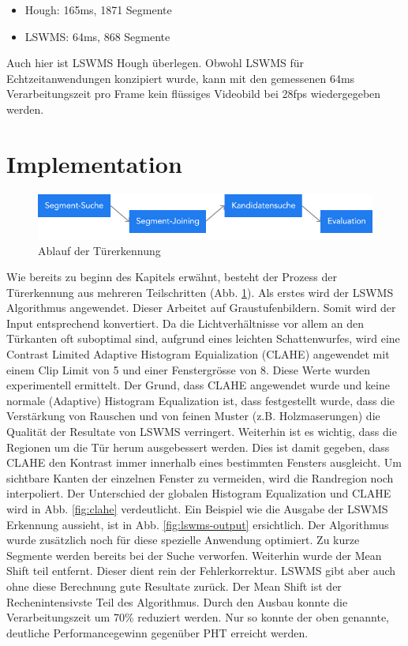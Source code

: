 \begin{itemize}
	\item Hough: 165ms, 1871 Segmente
	\item LSWMS: 64ms, 868 Segmente
\end{itemize}
\noindent
Auch hier ist LSWMS Hough überlegen. Obwohl LSWMS für Echtzeitanwendungen konzipiert wurde, kann mit den gemessenen 64ms Verarbeitungszeit pro Frame kein flüssiges Videobild bei 28fps wiedergegeben werden.

\section{Implementation}

\begin{figure}[!ht]
\centering
\includegraphics[width=\textwidth]{images/door-detection} 
\caption{Ablauf der Türerkennung}
\label{fig:door-detection}
\end{figure}
\noindent
Wie bereits zu beginn des Kapitels erwähnt, besteht der Prozess der Türerkennung aus mehreren Teilschritten (Abb. \ref{fig:door-detection}). Als erstes wird der LSWMS Algorithmus angewendet. Dieser Arbeitet auf Graustufenbildern. Somit wird der Input entsprechend konvertiert. Da die Lichtverhältnisse vor allem an den Türkanten oft suboptimal sind, aufgrund eines leichten Schattenwurfes, wird eine Contrast Limited Adaptive Histogram Equialization (CLAHE) angewendet mit einem Clip Limit von 5 und einer Fenstergrösse von 8. Diese Werte wurden experimentell ermittelt. Der Grund, dass CLAHE angewendet wurde und keine normale (Adaptive) Histogram Equalization ist, dass festgestellt wurde, dass die Verstärkung von Rauschen und von feinen Muster (z.B. Holzmaserungen) die Qualität der Resultate von LSWMS verringert. Weiterhin ist es wichtig, dass die Regionen um die Tür herum ausgebessert werden. Dies ist damit gegeben, dass CLAHE den Kontrast immer innerhalb eines bestimmten Fensters ausgleicht. Um sichtbare Kanten der einzelnen Fenster zu vermeiden, wird die Randregion noch interpoliert. Der Unterschied der globalen Histogram Equalization und CLAHE wird in Abb. \ref{fig:clahe} verdeutlicht. Ein Beispiel wie die Ausgabe der LSWMS Erkennung aussieht, ist in Abb. \ref{fig:lswms-output} ersichtlich. Der Algorithmus wurde zusätzlich noch für diese spezielle Anwendung optimiert. Zu kurze Segmente werden bereits bei der Suche verworfen. Weiterhin wurde der Mean Shift teil entfernt. Dieser dient rein der Fehlerkorrektur. LSWMS gibt aber auch ohne diese Berechnung gute Resultate zurück. Der Mean Shift ist der Rechenintensivste Teil des Algorithmus. Durch den Ausbau konnte die Verarbeitungszeit um 70\% reduziert werden. Nur so konnte der oben genannte, deutliche Performancegewinn gegenüber PHT erreicht werden.

